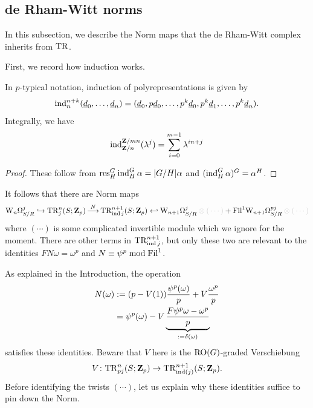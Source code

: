 \subsection{de Rham-Witt norms}
\label{sub:dRW-norm}

In this subsection, we describe the Norm maps that the de Rham-Witt complex inherits from $\mathrm{TR}$.

First, we record how induction works.

\begin{proposition}
  In $p$-typical notation, induction of polyrepresentations is given by
  \[ \operatorname{ind}_n^{n+k}(\underline d_0,\dotsc, \underline d_n) = (\underline d_0, p\underline d_0, \dotsc, p^k \underline d_0, p^k \underline d_1, \dotsc, p^k \underline d_n). \]
  Integrally, we have
  \[ \operatorname{ind}^{\mathbf Z/mn}_{\mathbf Z/n}(\lambda^j) = \sum_{i=0}^{m-1} \lambda^{in+j} \]
\end{proposition}
\begin{proof}
  These follow from $\operatorname{res}^G_H \operatorname{ind}^G_H \alpha = |G/H|\alpha$ and $(\operatorname{ind}^G_H\alpha)^G = \alpha^H$.
\end{proof}

It follows that there are Norm maps
\[ \dRW[n]^j_{S/R} \mono \TR^n_j(S;\Z_p) \morph^N \TR^{n+1}_{\ind j}(S;\Z_p) \hookleftarrow \dRW[n+1]^j_{S/R} \fade{{}\tnsr({}\cdots)} + \Fil^1\dRW[n+1]^{pj}_{S/R} \fade{{}\tnsr({}\cdots)}\]
where $({}\cdots)$ is some complicated invertible module which we ignore for the moment. There are other terms in $\mathrm{TR}^{n+1}_{\operatorname{ind} j}$, but only these two are relevant to the identities $FN\omega = \omega^p$ and $N \equiv \psi^p \bmod \mathrm{Fil}^1$.

As explained in the Introduction, the operation
\begin{align*}
  N(\omega)
    &\mathrel{:=} (p-V(1))\frac{\psi^p(\omega)}p + V\frac{\omega^p}p\\
    &= \psi^p(\omega) - V\underbrace{\frac{F\psi^p\omega - \omega^p}p}_{{}\mathrel{:=} \delta(\omega)}
\end{align*}
satisfies these identities. Beware that $V$ here is the $\operatorname{RO}(G)$-graded Verschiebung
\[ V\colon \mathrm{TR}^n_{pj}(S;\mathbf Z_p) \to \mathrm{TR}^{n+1}_{\operatorname{ind}(j)}(S;\mathbf Z_p). \]
Before identifying the twists $({}\cdots)$, let us explain why these identities suffice to pin down the Norm.

